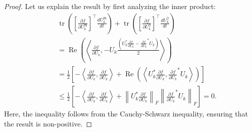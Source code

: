 \documentclass[onefignum,onetabnum]{siamart220329}
\begin{document}
    \begin{proof}
    Let us explain the result by first analyzing the inner product:  
    \begin{eqnarray}\label{eq:normU}  
    &&\operatorname{tr}\left(\left[\frac{\partial f}{\partial U_k^\mathfrak{R}
    }\right]^\top \frac{d U_k^\mathfrak{R}
    }{dt} \right) 
    +\operatorname{tr}\left(\left[\frac{\partial f}{\partial U_k^\mathfrak{I}
    }\right]^\top \frac{d U_k^\mathfrak{I}
    }{dt} \right)\nonumber\\
    &&= \operatorname{Re}\left(\left\langle \frac{\partial f}{\partial U_k}, -
     U_k \frac{\left( U_k^* 
    \frac{\partial f}{\partial U_k} -  
    {\frac{\partial f}{\partial U_k}}^* U_k 
    \right)}{2} \right\rangle\right ) \nonumber\\  
    &&=  \frac{1}{2}
    \left[
    -  \left\langle \frac{\partial f}{\partial U_k}, \frac{\partial f}{\partial U_k} \right\rangle
    + 
    \operatorname{Re} \left(
    \left\langle U_k^* \frac{\partial f}{\partial U_k}, {\frac{\partial f}{\partial U_k}}^* U_k  \right\rangle\right)  
    \right] \nonumber\\  
    &&\leq  
    \frac{1}{2}
    \left[
    -  \left\langle \frac{\partial f}{\partial U_k}, \frac{\partial f}{\partial U_k} \right\rangle
    + \left\| U_k^* \frac{\partial f}{\partial U_k} \right\|_F 
    \left
    \| {\frac{\partial f}{\partial U_k}}^* U_k \right\|_F  
    \right] = 0.  
    \end{eqnarray}  
    Here, the inequality follows from the Cauchy-Schwarz inequality, ensuring that the result is non-positive.
    

\end{proof}
\end{document}
